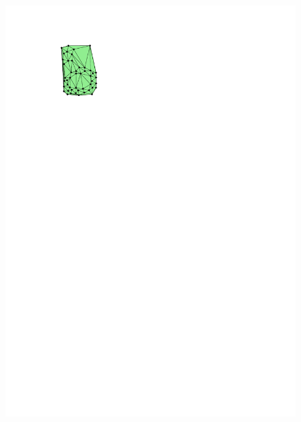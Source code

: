 \begin{marginfigure}
  \centering
  \begin{subfigure}[b]{0.6\linewidth}
    \centering
    \includegraphics[page=1,width=\textwidth]{figs/chishape.pdf}
    \caption{}
  \end{subfigure}
  \qquad 
  \begin{subfigure}[b]{0.6\linewidth}
    \centering

\end{subfigure}
\end{marginfigure}
